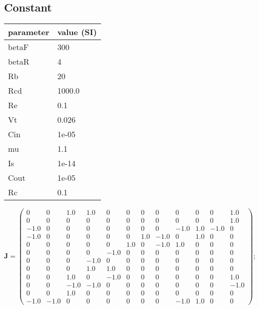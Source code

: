 \documentclass[11pt, oneside]{article}      %
\begin{document}
\subsection{Constant}
%
\begin{center}
%
\begin{tabular}{ll}
%
\hline
parameter & value (SI)
\\ \hline
betaF & 300
\\
betaR & 4
\\
Rb & 20
\\
Rcd & 1000.0
\\
Re & 0.1
\\
Vt & 0.026
\\
Cin & 1e-05
\\
mu & 1.1
\\
Is & 1e-14
\\
Cout & 1e-05
\\
Rc & 0.1
\\
\hline
\end{tabular}
%
\end{center}
%
$ \mathbf{J} = \left(\begin{array}{cccccccccccc}0 & 0 & 1.0 & 1.0 & 0 & 0 & 0 & 0 & 0 & 0 & 0 & 1.0\\0 & 0 & 0 & 0 & 0 & 0 & 0 & 0 & 0 & 0 & 0 & 1.0\\-1.0 & 0 & 0 & 0 & 0 & 0 & 0 & 0 & -1.0 & 1.0 & -1.0 & 0\\-1.0 & 0 & 0 & 0 & 0 & 0 & 1.0 & -1.0 & 0 & 1.0 & 0 & 0\\0 & 0 & 0 & 0 & 0 & 1.0 & 0 & -1.0 & 1.0 & 0 & 0 & 0\\0 & 0 & 0 & 0 & -1.0 & 0 & 0 & 0 & 0 & 0 & 0 & 0\\0 & 0 & 0 & -1.0 & 0 & 0 & 0 & 0 & 0 & 0 & 0 & 0\\0 & 0 & 0 & 1.0 & 1.0 & 0 & 0 & 0 & 0 & 0 & 0 & 0\\0 & 0 & 1.0 & 0 & -1.0 & 0 & 0 & 0 & 0 & 0 & 0 & 1.0\\0 & 0 & -1.0 & -1.0 & 0 & 0 & 0 & 0 & 0 & 0 & 0 & -1.0\\0 & 0 & 1.0 & 0 & 0 & 0 & 0 & 0 & 0 & 0 & 0 & 0\\-1.0 & -1.0 & 0 & 0 & 0 & 0 & 0 & 0 & -1.0 & 1.0 & 0 & 0\end{array}\right) ; $ 
%
\\
%
\end{document}

